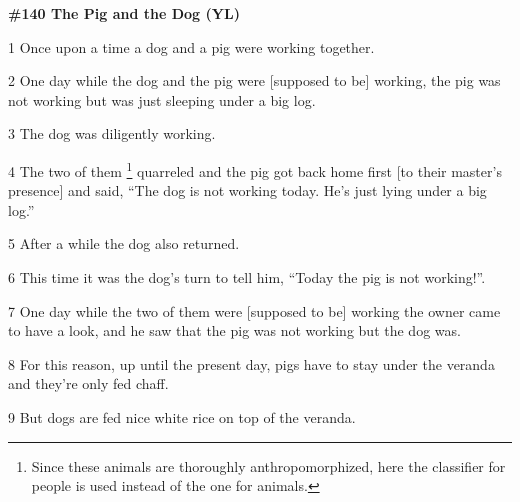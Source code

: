 
\textbf{\#140 The Pig and the Dog (YL)}

1 Once upon a time a dog and a pig were working together.

2 One day while the dog and the pig were [supposed to be] working, the pig was
not working but was just sleeping under a big log.

3 The dog was diligently working.

4 The two of them \footnote{Since these animals are thoroughly anthropomorphized, here the classifier for people is used instead of the one for animals.} quarreled and the pig got back home first [to their master's
presence] and said, ``The dog is not working today. He's just lying under a big
log.''

5 After a while the dog also returned.

6 This time it was the dog's turn to tell him,  ``Today the pig is not working!''.

7 One day while the two of them were [supposed to be] working the owner came to
have a look, and he saw that the pig was not working but the dog was.

8 For this reason, up until the present day, pigs have to stay under the veranda
and they're only fed chaff.

9 But dogs are fed nice white rice on top of the veranda.

